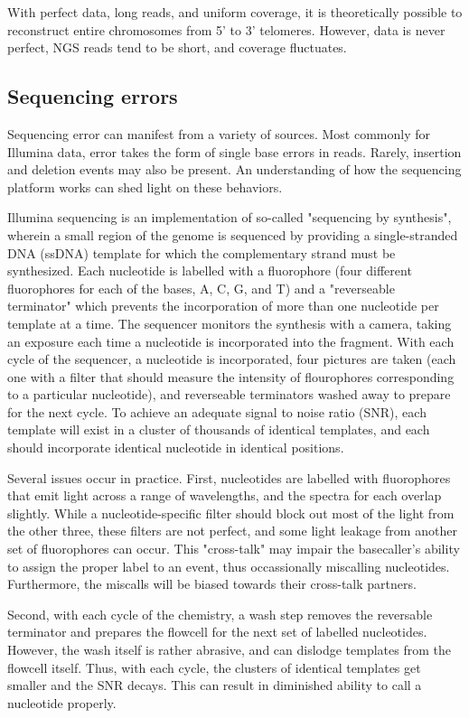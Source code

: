 With perfect data, long reads, and uniform coverage, it is theoretically possible to reconstruct entire chromosomes from 5' to 3' telomeres.  However, data is never perfect, NGS reads tend to be short, and coverage fluctuates.

\subsection{Sequencing errors}

Sequencing error can manifest from a variety of sources.  Most commonly for Illumina data, error takes the form of single base errors in reads.  Rarely, insertion and deletion events may also be present.  An understanding of how the sequencing platform works can shed light on these behaviors.

Illumina sequencing is an implementation of so-called "sequencing by synthesis", wherein a small region of the genome is sequenced by providing a single-stranded DNA (ssDNA) template for which the complementary strand must be synthesized.  Each nucleotide is labelled with a fluorophore (four different fluorophores for each of the bases, A, C, G, and T) and a "reverseable terminator" which prevents the incorporation of more than one nucleotide per template at a time.  The sequencer monitors the synthesis with a camera, taking an exposure each time a nucleotide is incorporated into the fragment.  With each cycle of the sequencer, a nucleotide is incorporated, four pictures are taken (each one with a filter that should measure the intensity of flourophores corresponding to a particular nucleotide), and reverseable terminators washed away to prepare for the next cycle.  To achieve an adequate signal to noise ratio (SNR), each template will exist in a cluster of thousands of identical templates, and each should incorporate identical nucleotide in identical positions.

Several issues occur in practice.  First, nucleotides are labelled with fluorophores that emit light across a range of wavelengths, and the spectra for each overlap slightly.  While a nucleotide-specific filter should block out most of the light from the other three, these filters are not perfect, and some light leakage from another set of fluorophores can occur.  This "cross-talk" may impair the basecaller's ability to assign the proper label to an event, thus occassionally miscalling nucleotides.  Furthermore, the miscalls will be biased towards their cross-talk partners.

Second, with each cycle of the chemistry, a wash step removes the reversable terminator and prepares the flowcell for the next set of labelled nucleotides.  However, the wash itself is rather abrasive, and can dislodge templates from the flowcell itself.  Thus, with each cycle, the clusters of identical templates get smaller and the SNR decays.  This can result in diminished ability to call a nucleotide properly.

